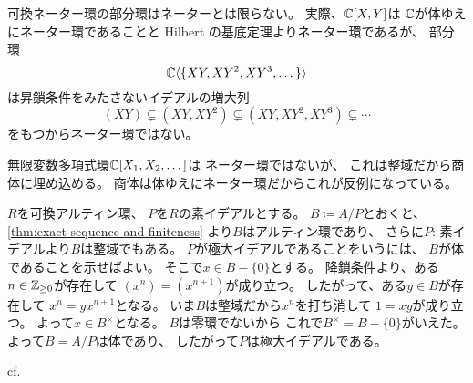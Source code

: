 \documentclass[report]{jlreq}
\begin{document}
\begin{answer}[解法1.]
可換ネーター環の部分環はネーターとは限らない。
実際、$\mathbb{C}[X, Y]$は
$\mathbb{C}$が体ゆえにネーター環であることと
Hilbert の基底定理よりネーター環であるが、
部分環
\begin{equation}
    \mathbb{C}\langle \{ XY, XY^2, XY^3, \dots \} \rangle
\end{equation}
は昇鎖条件をみたさないイデアルの増大列
\begin{equation}
    (XY) \subsetneq (XY, XY^2) \subsetneq (XY, XY^2, XY^3) \subsetneq \cdots
\end{equation}
をもつからネーター環ではない。
\end{answer}

\begin{answer}[解法2.]
    無限変数多項式環$\mathbb{C}[X_1, X_2, \dots]$は
    ネーター環ではないが、
    これは整域だから商体に埋め込める。
    商体は体ゆえにネーター環だからこれが反例になっている。
\end{answer}


\begin{answer}
$R$を可換アルティン環、
$P$を$R$の素イデアルとする。
$B \coloneqq A / P$とおくと、
\cref{thm:exact-sequence-and-finiteness}
より$B$はアルティン環であり、
さらに$P$: 素イデアルより$B$は整域でもある。
$P$が極大イデアルであることをいうには、
$B$が体であることを示せばよい。
そこで$x \in B - \{ 0 \}$とする。
降鎖条件より、ある$n \in \mathbb{Z}_{\ge 0}$が存在して
$(x^n) = (x^{n + 1})$が成り立つ。
したがって、ある$y \in B$が存在して
$x^n = yx^{n + 1}$となる。
いま$B$は整域だから$x^n$を打ち消して
$1 = xy$が成り立つ。
よって$x \in B^\times$となる。
$B$は零環でないから
これで$B^\times = B - \{ 0 \}$がいえた。
よって$B = A / P$は体であり、
したがって$P$は極大イデアルである。
\end{answer}


\begin{answer}
    \TODO{}
    cf. \cite[p.89]{AM69}
\end{answer}
\end{document}

